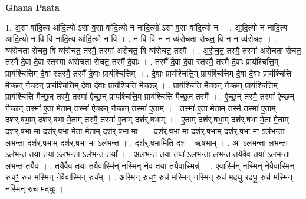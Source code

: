 \documentclass[17pt]{extarticle}
\begin{document}
\textbf{Ghana Paata } \newline

1. अ॒सा वा॑दि॒त्य आ॑दि॒त्यो॑ ऽसा व॒सा वा॑दि॒त्यो न नादि॒त्यो॑ ऽसा व॒सा वा॑दि॒त्यो न । . आ॒दि॒त्यो न नादि॒त्य आ॑दि॒त्यो न वि वि नादि॒त्य आ॑दि॒त्यो न वि । . न वि वि न न व्य॑रोचता रोचत॒ वि न न व्य॑रोचत । . व्य॑रोचता रोचत॒ वि व्य॑रोचत॒ तस्मै॒ तस्मा॑ अरोचत॒ वि व्य॑रोचत॒ तस्मै᳚ । . अ॒रो॒च॒त॒ तस्मै॒ तस्मा॑ अरोचता रोचत॒ तस्मै॑ दे॒वा दे॒वा स्तस्मा॑ अरोचता रोचत॒ तस्मै॑ दे॒वाः । . तस्मै॑ दे॒वा दे॒वा स्तस्मै॒ तस्मै॑ दे॒वाः प्राय॑श्चित्ति॒म् प्राय॑श्चित्तिम् दे॒वा स्तस्मै॒ तस्मै॑ दे॒वाः प्राय॑श्चित्तिम् । . दे॒वाः प्राय॑श्चित्ति॒म् प्राय॑श्चित्तिम् दे॒वा दे॒वाः प्राय॑श्चित्ति मैच्छन् नैच्छ॒न् प्राय॑श्चित्तिम् दे॒वा दे॒वाः प्राय॑श्चित्ति मैच्छन्न् । . प्राय॑श्चित्ति मैच्छन् नैच्छ॒न् प्राय॑श्चित्ति॒म् प्राय॑श्चित्ति मैच्छ॒न् तस्मै॒ तस्मा॑ ऐच्छ॒न् प्राय॑श्चित्ति॒म् प्राय॑श्चित्ति मैच्छ॒न् तस्मै᳚ । . ऐ॒च्छ॒न् तस्मै॒ तस्मा॑ ऐच्छन् नैच्छ॒न् तस्मा॑ ए॒ता मे॒ताम् तस्मा॑ ऐच्छन् नैच्छ॒न् तस्मा॑ ए॒ताम् । . तस्मा॑ ए॒ता मे॒ताम् तस्मै॒ तस्मा॑ ए॒ताम् दश॑र्.षभा॒म् दश॑र्.षभा मे॒ताम् तस्मै॒ तस्मा॑ ए॒ताम् दश॑र्.षभाम् । . ए॒ताम् दश॑र्.षभा॒म् दश॑र्.षभा मे॒ता मे॒ताम् दश॑र्.षभा॒ मा दश॑र्.षभा मे॒ता मे॒ताम् दश॑र्.षभा॒ मा । . दश॑र्.षभा॒ मा दश॑र्.षभा॒म् दश॑र्.षभा॒ मा ऽल॑भन्ता लभ॒न्ता दश॑र्.षभा॒म् दश॑र्.षभा॒ मा ऽल॑भन्त । . दश॑र्.षभा॒मिति॒ दश॑ - ऋ॒ष॒भा॒म् । . आ ऽल॑भन्ता लभ॒न्ता ऽल॑भन्त॒ तया॒ तया॑ ऽलभ॒न्ता ऽल॑भन्त॒ तया᳚ । . अ॒ल॒भ॒न्त॒ तया॒ तया॑ ऽलभन्ता लभन्त॒ तयै॒वैव तया॑ ऽलभन्ता लभन्त॒ तयै॒व । . तयै॒वैव तया॒ तयै॒वास्मि॑न् नस्मिन् ने॒व तया॒ तयै॒वास्मिन्न्॑ । . ए॒वास्मि॑न् नस्मिन् ने॒वैवास्मि॒न् रुचꣳ॒॒ रुच॑ मस्मिन् ने॒वैवास्मि॒न् रुच᳚म् । . अ॒स्मि॒न् रुचꣳ॒॒ रुच॑ मस्मिन् नस्मि॒न् रुच॑ मदधु रदधू॒ रुच॑ मस्मिन् नस्मि॒न् रुच॑ मदधुः । \newline
\end{document}
